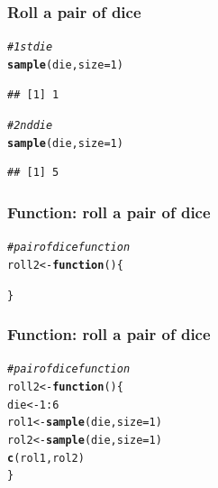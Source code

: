 \documentclass[12pt]{beamer}\usepackage[]{graphicx}\usepackage[]{color}
\makeatletter
\newcommand{\hlnum}[1]{\textcolor[rgb]{0.686,0.059,0.569}{#1}}%
\newcommand{\hlcom}[1]{\textcolor[rgb]{0.678,0.584,0.686}{\textit{#1}}}%
\newcommand{\hlopt}[1]{\textcolor[rgb]{0,0,0}{#1}}%
\newcommand{\hlstd}[1]{\textcolor[rgb]{0.345,0.345,0.345}{#1}}%
\newcommand{\hlkwa}[1]{\textcolor[rgb]{0.161,0.373,0.58}{\textbf{#1}}}%
\newcommand{\hlkwb}[1]{\textcolor[rgb]{0.69,0.353,0.396}{#1}}%
\newcommand{\hlkwc}[1]{\textcolor[rgb]{0.333,0.667,0.333}{#1}}%
\newcommand{\hlkwd}[1]{\textcolor[rgb]{0.737,0.353,0.396}{\textbf{#1}}}%
\newenvironment{kframe}{%
 \def\at@end@of@kframe{}%
 \ifinner\ifhmode%
  \def\at@end@of@kframe{\end{minipage}}%
  \begin{minipage}{\columnwidth}%
 \fi\fi%
 \def\FrameCommand##1{\hskip\@totalleftmargin \hskip-\fboxsep
 \colorbox{shadecolor}{##1}\hskip-\fboxsep
     \hskip-\linewidth \hskip-\@totalleftmargin \hskip\columnwidth}%
 \MakeFramed {\advance\hsize-\width
   \@totalleftmargin\z@ \linewidth\hsize
   \@setminipage}}%
 {\par\unskip\endMakeFramed%
 \at@end@of@kframe}
\newenvironment{knitrout}{}{} %
\makeatother
\begin{document}
\begin{frame}[fragile]
\frametitle{Roll a pair of dice}

\begin{knitrout}\footnotesize
{}\color{fgcolor}\begin{kframe}
\begin{alltt}
\hlcom{# 1st die}
\hlkwd{sample}\hlstd{(die,} \hlkwc{size} \hlstd{=} \hlnum{1}\hlstd{)}
\end{alltt}
\begin{verbatim}
## [1] 1
\end{verbatim}
\begin{alltt}
\hlcom{# 2nd die}
\hlkwd{sample}\hlstd{(die,} \hlkwc{size} \hlstd{=} \hlnum{1}\hlstd{)}
\end{alltt}
\begin{verbatim}
## [1] 5
\end{verbatim}
\end{kframe}
\end{knitrout}

\end{frame}


\begin{frame}[fragile]
\frametitle{Function: roll a pair of dice}

\begin{knitrout}\footnotesize
{}\color{fgcolor}\begin{kframe}
\begin{alltt}
\hlcom{# pair of dice function}
\hlstd{roll2} \hlkwb{<-} \hlkwa{function}\hlstd{() \{}




\hlstd{\}}
\end{alltt}
\end{kframe}
\end{knitrout}

\end{frame}


\begin{frame}[fragile]
\frametitle{Function: roll a pair of dice}

\begin{knitrout}\footnotesize
{}\color{fgcolor}\begin{kframe}
\begin{alltt}
\hlcom{# pair of dice function}
\hlstd{roll2} \hlkwb{<-} \hlkwa{function}\hlstd{() \{}
  \hlstd{die} \hlkwb{<-} \hlnum{1}\hlopt{:}\hlnum{6}
  \hlstd{rol1} \hlkwb{<-} \hlkwd{sample}\hlstd{(die,} \hlkwc{size} \hlstd{=} \hlnum{1}\hlstd{)}
  \hlstd{rol2} \hlkwb{<-} \hlkwd{sample}\hlstd{(die,} \hlkwc{size} \hlstd{=} \hlnum{1}\hlstd{)}
  \hlkwd{c}\hlstd{(rol1, rol2)}
\hlstd{\}}
\end{alltt}
\end{kframe}
\end{knitrout}

\end{frame}
\end{document}
